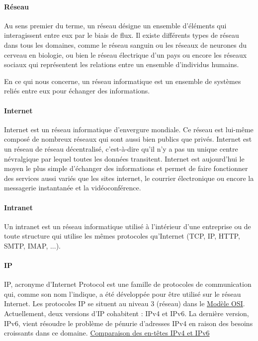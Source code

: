 \documentclass[french]{article}
\begin{document}
\paragraph{Réseau}

Au sens premier du terme, un réseau désigne un ensemble d'éléments qui interagissent entre eux par le biais de flux.
Il existe différents types de réseau dans tous les domaines, comme le réseau sanguin ou les réseaux de neurones du cerveau en biologie, ou bien le réseau électrique d'un pays ou encore les réseaux sociaux qui représentent les relations entre un ensemble d'individus humains.

En ce qui nous concerne, un réseau informatique est un ensemble de systèmes reliés entre eux pour échanger des informations.

\paragraph{Internet}

Internet est un réseau informatique d'envergure mondiale. Ce réseau est lui-même composé de nombreux réseaux qui sont aussi bien publics que privés. Internet est un réseau de réseau décentralisé, c'est-à-dire qu'il n'y a pas un unique centre névralgique par lequel toutes les données transitent.
Internet est aujourd'hui le moyen le plus simple d'échanger des informations et permet de faire fonctionner des services aussi variés que les sites internet, le courrier électronique ou encore la messagerie instantanée et la vidéoconférence.

\paragraph{Intranet}

Un intranet est un réseau informatique utilisé à l'intérieur d'une entreprise ou de toute structure qui utilise les mêmes protocoles qu'Internet (TCP, IP, HTTP, SMTP, IMAP, ...).

\paragraph{IP}

IP, acronyme d'Internet Protocol est une famille de protocoles de communication qui, comme son nom l'indique, a été développée pour être utilisé sur le réseau Internet.
Les protocoles IP se situent au niveau 3 (réseau) dans le \hyperlink{modele_osi}{Modèle OSI}.
Actuellement, deux versions d'IP cohabitent : IPv4 et IPv6. La dernière version, IPv6, vient résoudre le problème de pénurie d'adresses IPv4 en raison des besoins croissants dans ce domaine.
\hyperlink{ipv4_vs_ipv6}{Comparaison des en-têtes IPv4 et IPv6}
\end{document}
